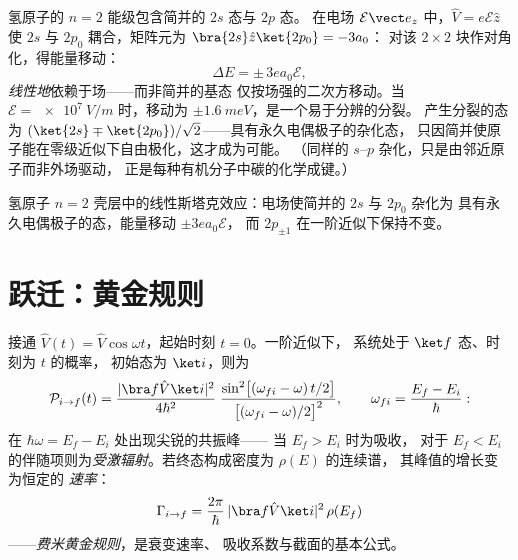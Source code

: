 \begin{example}[线性斯塔克效应]\label{ex:b3:perturbation-theory:stark}
氢原子的 $n = 2$ 能级包含简并的 $2s$ 态与 $2p$ 态。
在电场 $\mathcal E\vect e_z$ 中，$\hat V = e\mathcal E\hat z$
使 $2s$ 与 $2p_0$ 耦合，矩阵元为 $\bra{2s}\hat z\ket{2p_0} = -3a_0$：
对该 $2\times2$ 块作对角化，得能量移动：
\[
\Delta E = \pm\,3e a_0\mathcal E ,
\]
\emph{线性地}依赖于场——而非简并的基态
仅按场强的二次方移动。当 $\mathcal E = \qty{e7}{V/m}$ 时，移动为 $\pm
\qty{1.6}{meV}$，是一个易于分辨的分裂。
产生分裂的态为 $(\ket{2s} \mp \ket{2p_0})/\sqrt2$——具有永久电偶极子的杂化态，
只因简并使原子能在零级近似下自由极化，这才成为可能。
（同样的 $s$--$p$
杂化，只是由邻近原子而非外场驱动，
正是每种有机分子中碳的化学成键。）
\end{example}

\begin{omfigure}

{\small 氢原子 $n = 2$ 壳层中的线性斯塔克效应：电场使简并的
$2s$ 与 $2p_0$ 杂化为
具有永久电偶极子的态，能量移动 $\pm3ea_0\mathcal E$，
而 $2p_{\pm1}$ 在一阶近似下保持不变。}
\end{omfigure}

\section{跃迁：黄金规则}

\begin{theorem}[含时微扰]\label{thm:b3:perturbation-theory:golden}
接通 $\hat V(t) = \hat V\cos\omega t$，起始时刻 $t = 0$。一阶近似下，
系统处于 $\ket f$ 态、时刻为 $t$ 的概率，
初始态为 $\ket i$，则为
\[
\mathcal P_{i\to f}(t) = \frac{|\bra f\hat V\ket i|^2}{4\hbar^2}\;
\frac{\sin^2\!\big[(\omega_{fi} - \omega)\,t/2\big]}
{\big[(\omega_{fi} - \omega)/2\big]^2} ,
\qquad \omega_{fi} = \frac{E_f - E_i}{\hbar} :
\]
在 $\hbar\omega = E_f - E_i$ 处出现尖锐的共振峰——
当 $E_f > E_i$ 时为吸收，
对于 $E_f < E_i$ 的伴随项则为\emph{受激辐射}。若终态构成密度为 $\rho(E)$ 的连续谱，
其峰值的增长变为恒定的
\emph{速率}：
\[
\Gamma_{i\to f} = \frac{2\pi}{\hbar}\,
|\bra f\hat V\ket i|^2\,\rho(E_f)
\]
——\emph{费米黄金规则}，是衰变速率、
吸收系数与截面的基本公式。
\end{theorem}

